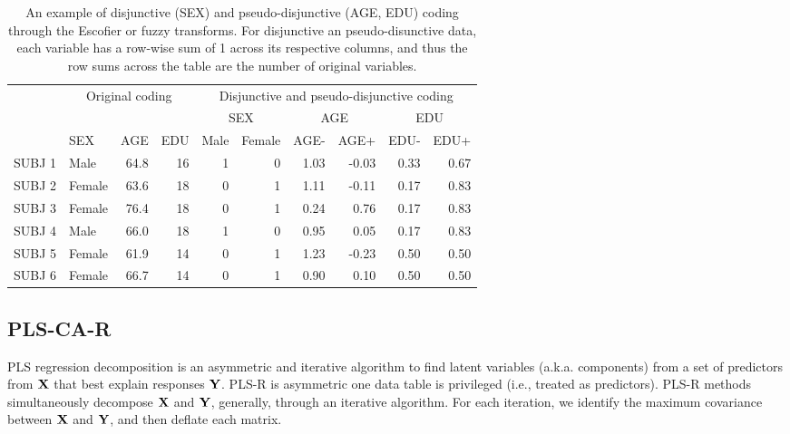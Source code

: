\documentclass[12pt]{article}
\begin{document}
\begin{table}[!h]

\caption{\label{tab:unnamed-chunk-1}\label{table:disj} An example of disjunctive (SEX) and pseudo-disjunctive (AGE, EDU) coding through the Escofier or fuzzy transforms. For disjunctive an pseudo-disunctive data, each variable has a row-wise sum of 1 across its respective columns, and thus the row sums across the table are the number of original variables.}
\centering
\begin{tabular}[t]{llrrrrrrrr}
\toprule
\multicolumn{1}{c}{ } & \multicolumn{3}{c}{Original coding} & \multicolumn{6}{c}{Disjunctive and pseudo-disjunctive coding} \\
\cmidrule(l{3pt}r{3pt}){2-4} \cmidrule(l{3pt}r{3pt}){5-10}
\multicolumn{4}{c}{ } & \multicolumn{2}{c}{SEX} & \multicolumn{2}{c}{AGE} & \multicolumn{2}{c}{EDU} \\
\cmidrule(l{3pt}r{3pt}){5-6} \cmidrule(l{3pt}r{3pt}){7-8} \cmidrule(l{3pt}r{3pt}){9-10}
  & SEX & AGE & EDU & Male & Female & AGE- & AGE+ & EDU- & EDU+\\
\midrule
SUBJ 1 & Male & 64.8 & 16 & 1 & 0 & 1.03 & -0.03 & 0.33 & 0.67\\
SUBJ 2 & Female & 63.6 & 18 & 0 & 1 & 1.11 & -0.11 & 0.17 & 0.83\\
SUBJ 3 & Female & 76.4 & 18 & 0 & 1 & 0.24 & 0.76 & 0.17 & 0.83\\
SUBJ 4 & Male & 66.0 & 18 & 1 & 0 & 0.95 & 0.05 & 0.17 & 0.83\\
SUBJ 5 & Female & 61.9 & 14 & 0 & 1 & 1.23 & -0.23 & 0.50 & 0.50\\
\addlinespace
SUBJ 6 & Female & 66.7 & 14 & 0 & 1 & 0.90 & 0.10 & 0.50 & 0.50\\
\bottomrule
\end{tabular}
\end{table}

\hypertarget{pls-ca-r}{%
\subsection{PLS-CA-R}\label{pls-ca-r}}

\label{section:plscar_form}

PLS regression
\citep{wold1975soft, wold_collinearity_1984, wold_pls-regression_2001}
decomposition is an asymmetric and iterative algorithm to find latent
variables (a.k.a. components) from a set of predictors from \({\bf X}\)
that best explain responses \({\bf Y}\). PLS-R is asymmetric one data
table is privileged (i.e., treated as predictors). PLS-R methods
simultaneously decompose \({\bf X}\) and \({\bf Y}\), generally, through
an iterative algorithm. For each iteration, we identify the maximum
covariance between \({\bf X}\) and \({\bf Y}\), and then deflate each
matrix.
\end{document}
